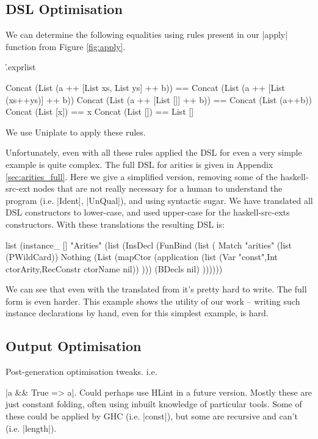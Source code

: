 \documentclass[preprint,draft]{sigplanconf}
\begin{document}
\subsection{DSL Optimisation}
\label{sec:dsl_optimisation}

We can determine the following equalities using rules present in our |apply| function from Figure \ref{fig:apply}.

\h{.exprlist}\begin{code}
Concat (List (a ++ [List xs, List ys] ++ b)) ==
    Concat (List (a ++ [List (xs++ys)] ++ b))
Concat (List (a ++ [List []] ++ b)) == Concat (List (a++b))
Concat (List [x]) == x
Concat (List []) == List []
\end{code}

We use Uniplate \cite{uniplate} to apply these rules.

Unfortunately, even with all these rules applied the DSL for even a very simple example is quite complex. The full DSL for arities is given in Appendix \ref{sec:arities_full}. Here we give a simplified version, removing some of the haskell-src-ext nodes that are not really necessary for a human to understand the program (i.e. |Ident|, |UnQual|), and using syntactic sugar. We have translated all DSL constructors to lower-case, and used upper-case for the haskell-src-exts constructors. With these translations the resulting DSL is:

\begin{code}
list (instance_ [] "Arities" (list (InsDecl (FunBind (list (
    Match "arities"
        (list (PWildCard))
        Nothing
        (List (mapCtor (application
            (list (Var "const",Int ctorArity,RecConstr ctorName nil))
        )))
        (BDecls nil)
))))))
\end{code}

We can see that even with the translated from it's pretty hard to write. The full form is even harder. This example shows the utility of our work -- writing such instance declarations by hand, even for this simplest example, is hard.

\subsection{Output Optimisation}
\label{sec:simplify}

Post-generation optimisation tweaks. i.e. \ignore|a && True => a|. Could perhaps use HLint in a future version. Mostly these are just constant folding, often using inbuilt knowledge of particular tools. Some of these could be applied by GHC (i.e. |const|), but some are recursive and can't (i.e. |length|).
\end{document}
